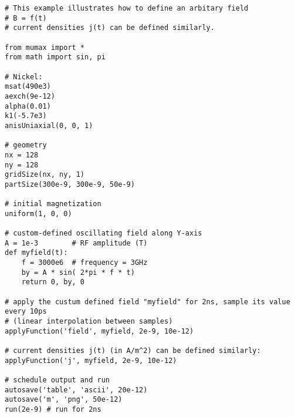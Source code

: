 \begin{verbatim}
# This example illustrates how to define an arbitary field
# B = f(t)
# current densities j(t) can be defined similarly.

from mumax import *
from math import sin, pi

# Nickel:
msat(490e3)   
aexch(9e-12)     
alpha(0.01)
k1(-5.7e3)
anisUniaxial(0, 0, 1)

# geometry 
nx = 128
ny = 128
gridSize(nx, ny, 1)    
partSize(300e-9, 300e-9, 50e-9)

# initial magnetization
uniform(1, 0, 0)

# custom-defined oscillating field along Y-axis
A = 1e-3    	# RF amplitude (T)
def myfield(t):
    f = 3000e6  # frequency = 3GHz
    by = A * sin( 2*pi * f * t)
    return 0, by, 0

# apply the custum defined field "myfield" for 2ns, sample its value every 10ps
# (linear interpolation between samples)
applyFunction('field', myfield, 2e-9, 10e-12) 

# current densities j(t) (in A/m^2) can be defined similarly:
applyFunction('j', myfield, 2e-9, 10e-12) 

# schedule output and run
autosave('table', 'ascii', 20e-12)
autosave('m', 'png', 50e-12)
run(2e-9) # run for 2ns

\end{verbatim}









